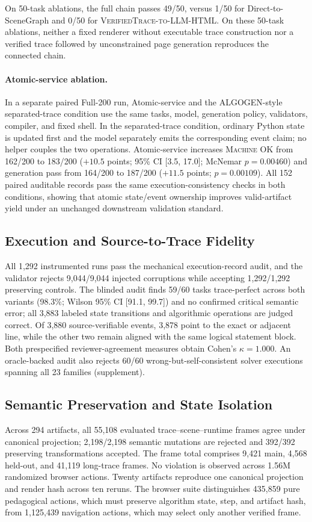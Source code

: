 \documentclass[letterpaper]{article}
\newcommand{\machineok}{\textsc{Machine OK}}
\newcommand{\vtllm}{\textsc{VerifiedTrace-to-LLM-HTML}}
\begin{document}
On 50-task ablations, the
full chain passes 49/50, versus 1/50 for Direct-to-SceneGraph and 0/50
for \vtllm{}. On these 50-task ablations, neither a fixed renderer
without executable trace construction nor a verified trace followed by
unconstrained page generation reproduces the connected chain.

\paragraph{Atomic-service ablation.}
In a separate paired Full-200 run, Atomic-service and the
ALGOGEN-style separated-trace condition use the same tasks, model,
generation policy, validators, compiler, and fixed shell. In the
separated-trace condition, ordinary Python state is updated first and
the model separately emits the corresponding event claim; no helper
couples the two operations. Atomic-service increases \machineok{} from
162/200 to 183/200 (\(+10.5\) points; 95\% CI [3.5, 17.0]; McNemar
\(p=0.00460\)) and generation pass from 164/200 to 187/200
(\(+11.5\) points; \(p=0.00109\)). All 152 paired auditable records
pass the same execution-consistency checks in both conditions, showing
that atomic state/event ownership improves valid-artifact yield under an
unchanged downstream validation standard.

\subsection{Execution and Source-to-Trace Fidelity}
All 1,292 instrumented runs pass the mechanical execution-record audit,
and the validator rejects 9,044/9,044 injected corruptions while
accepting 1,292/1,292 preserving controls. The blinded audit finds
59/60 tasks trace-perfect across both variants (98.3\%; Wilson 95\% CI
[91.1, 99.7]) and no confirmed critical semantic error; all 3,883
labeled state transitions and algorithmic operations are judged correct.
Of 3,880 source-verifiable events, 3,878 point to the exact or adjacent
line, while the other two remain aligned with the same logical statement
block. Both prespecified reviewer-agreement measures obtain Cohen's
\(\kappa=1.000\). An oracle-backed audit also rejects 60/60
wrong-but-self-consistent solver executions spanning all 23 families
(supplement).

\subsection{Semantic Preservation and State Isolation}
Across 294 artifacts, all 55,108 evaluated trace--scene--runtime frames
agree under canonical projection; 2,198/2,198 semantic mutations are
rejected and 392/392 preserving transformations accepted. The frame
total comprises 9,421 main, 4,568 held-out, and 41,119 long-trace
frames. No violation is observed across 1.56M randomized browser
actions.
Twenty artifacts reproduce one canonical projection and render hash
across ten reruns. The browser suite distinguishes 435,859 pure
pedagogical actions, which must preserve algorithm state, step, and
artifact hash, from 1,125,439 navigation actions, which may select only
another verified frame.
\end{document}
